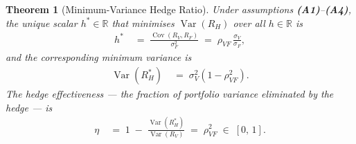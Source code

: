 \documentclass[12pt,openany]{book}
\newcommand{\R}{\mathbb{R}}
\numberwithin{equation}{chapter}
\theoremstyle{plain}
\newtheorem{theorem}{Theorem}[chapter]
\theoremstyle{definition}
\theoremstyle{remark}
\numberwithin{equation}{chapter}
\theoremstyle{plain}
\DeclareMathOperator{\Var}{Var}
\DeclareMathOperator{\Cov}{Cov}
\begin{document}
\begin{theorem}[Minimum-Variance Hedge Ratio]
\label{thm:hedge-ratio}
Under assumptions \textbf{(A1)}--\textbf{(A4)}, the unique scalar
$h^* \in \R$ that minimises $\Var(R_H)$ over all $h \in \R$ is
\begin{align}
  h^*
    &\;=\; \frac{\Cov(R_V, R_F)}{\sigma_F^2}
    \;=\; \rho_{VF}\,\frac{\sigma_V}{\sigma_F},
  \label{eq:hedge-ratio}
\end{align}
and the corresponding minimum variance is
\begin{align}
  \Var(R_H^*)
    &\;=\; \sigma_V^2\!\left(1 - \rho_{VF}^2\right).
  \label{eq:min-hedged-var}
\end{align}
The \emph{hedge effectiveness} — the fraction of portfolio variance
eliminated by the hedge — is
\begin{align}
  \eta
    &\;=\; 1 \;-\; \frac{\Var(R_H^*)}{\Var(R_V)}
    \;=\; \rho_{VF}^2
    \;\in\; [0,\,1].
  \label{eq:hedge-effectiveness}
\end{align}
\end{theorem}
\end{document}
